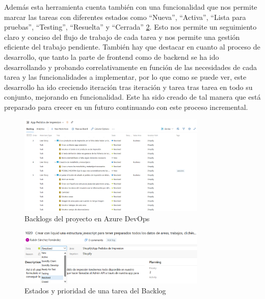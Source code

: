 \documentclass[12pt]{article}
\begin{document}
Además esta herramienta cuenta también con una funcionalidad que nos permite marcar las tareas con diferentes estados como ``Nueva'', ``Activa'', ``Lista para pruebas'', ``Testing'', ``Resuelta'' y ``Cerrada'' \ref{fig:4}. Esto nos permite un seguimiento claro y conciso del flujo de trabajo de cada tarea
y nos permite una gestión eficiente del trabajo pendiente. También hay que destacar en cuanto al proceso de desarrollo, que tanto la parte de frontend como de backend se ha ido desarrollando y probando correlativamente en función de las necesidades de cada tarea y las funcionalidades a implementar, por lo que como se puede ver, 
este desarrollo ha ido creciendo iteración tras iteración y tarea tras tarea en todo su conjunto, mejorando en funcionalidad. Este ha sido creado de tal manera que está preparado para crecer en un futuro continuando con este proceso incremental.

\begin{figure}[ht]
    \centering
    \includegraphics[width=0.8\textwidth]{imagenes/Backlogs de Devops.png}
    \caption{\label{fig:3}Backlogs del proyecto en Azure DevOps}
    \vspace{\fill}
\end{figure}

\begin{figure}[ht]
    \centering
    \includegraphics[width=0.8\textwidth]{imagenes/Estados y prioridad de tarea.png}
    \caption{\label{fig:4}Estados y prioridad de una tarea del Backlog}
    \vspace{\fill}
\end{figure}
\end{document}
